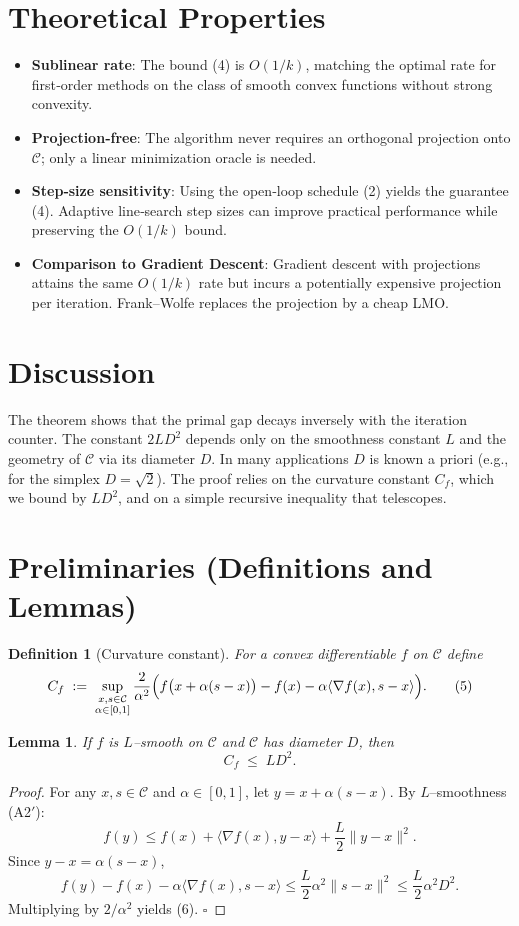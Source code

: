 \documentclass{article}
\newtheorem{lemma}{Lemma}
\newtheorem{definition}{Definition}
\begin{document}
\section*{Theoretical Properties}
\begin{itemize}
    \item \textbf{Sublinear rate}: The bound (4) is $O(1/k)$, matching the optimal rate for first‑order methods on the class of smooth convex functions without strong convexity.
    \item \textbf{Projection‑free}: The algorithm never requires an orthogonal projection onto $\mathcal{C}$; only a linear minimization oracle is needed.
    \item \textbf{Step‑size sensitivity}: Using the open‑loop schedule (2) yields the guarantee (4). Adaptive line‑search step sizes can improve practical performance while preserving the $O(1/k)$ bound.
    \item \textbf{Comparison to Gradient Descent}: Gradient descent with projections attains the same $O(1/k)$ rate but incurs a potentially expensive projection per iteration. Frank–Wolfe replaces the projection by a cheap LMO.
\end{itemize}

\section*{Discussion}
The theorem shows that the primal gap decays inversely with the iteration counter. The constant $2LD^{2}$ depends only on the smoothness constant $L$ and the geometry of $\mathcal{C}$ via its diameter $D$. In many applications $D$ is known a priori (e.g., for the simplex $D=\sqrt{2}$). The proof relies on the curvature constant $C_f$, which we bound by $LD^{2}$, and on a simple recursive inequality that telescopes.

\section*{Preliminaries (Definitions and Lemmas)}
\begin{definition}[Curvature constant]\label{def:curvature}
For a convex differentiable $f$ on $\mathcal{C}$ define
\[
C_f \;:=\; \sup_{\substack{x,s\in\mathcal{C}\\ \alpha\in[0,1]}}
\frac{2}{\alpha^{2}}\Bigl( f\bigl(x+\alpha(s-x)\bigr)-f(x)-\alpha\langle\nabla f(x),s-x\rangle\Bigr).
\tag{5}
\]
\end{definition}
\begin{lemma}\label{lem:curv_bound}
If $f$ is $L$–smooth on $\mathcal{C}$ and $\mathcal{C}$ has diameter $D$, then
\[
C_f \;\le\; L D^{2}.
\tag{6}
\]
\end{lemma}
\begin{proof}
For any $x,s\in\mathcal{C}$ and $\alpha\in[0,1]$, let $y=x+\alpha(s-x)$.  
By $L$–smoothness (A2$'$):
\[
f(y)\le f(x)+\langle\nabla f(x),y-x\rangle+\frac{L}{2}\|y-x\|^{2}.
\]
Since $y-x=\alpha(s-x)$,
\[
f(y)-f(x)-\alpha\langle\nabla f(x),s-x\rangle
\le \frac{L}{2}\alpha^{2}\|s-x\|^{2}
\le \frac{L}{2}\alpha^{2}D^{2}.
\]
Multiplying by $2/\alpha^{2}$ yields (6). \hfill$\square$
\end{proof}
\end{document}
